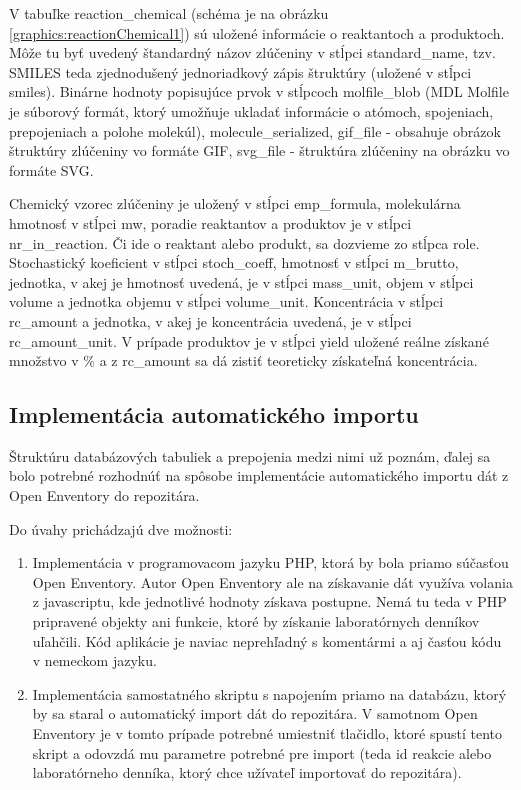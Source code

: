 \documentclass[thesis=M,slovak]{FITthesis}[2013/05/06]
\begin{document}

V tabuľke reaction\_chemical (schéma je na obrázku \ref{graphics:reactionChemical1}) sú uložené informácie o reaktantoch a produktoch. Môže tu byť uvedený štandardný názov zlúčeniny v stĺpci standard\_name, tzv. SMILES teda zjednodušený jednoriadkový zápis štruktúry (uložené v stĺpci smiles). Binárne hodnoty popisujúce prvok v stĺpcoch molfile\_blob (MDL Molfile je súborový formát, ktorý umožňuje ukladať informácie o atómoch, spojeniach, prepojeniach a polohe molekúl), molecule\_serialized, gif\_file - obsahuje obrázok štruktúry zlúčeniny vo formáte GIF, svg\_file - štruktúra zlúčeniny na obrázku vo formáte SVG.

Chemický vzorec zlúčeniny je uložený v stĺpci emp\_formula, molekulárna hmotnosť v stĺpci mw, poradie reaktantov a produktov je v stĺpci nr\_in\_reaction. Či ide o reaktant alebo produkt, sa dozvieme zo stĺpca role. Stochastický koeficient v stĺpci stoch\_coeff, hmotnosť v stĺpci m\_brutto, jednotka, v akej je hmotnosť uvedená, je v stĺpci mass\_unit, objem v stĺpci volume a jednotka objemu v stĺpci volume\_unit. Koncentrácia v stĺpci rc\_amount a jednotka, v akej je koncentrácia uvedená, je v stĺpci rc\_amount\_unit.
V prípade produktov je v stĺpci yield uložené reálne získané množstvo v \% a z rc\_amount sa dá zistiť teoreticky získateľná koncentrácia.

\subsection{Implementácia automatického importu}
Štruktúru databázových tabuliek a prepojenia medzi nimi už poznám, ďalej sa bolo potrebné rozhodnúť na spôsobe implementácie automatického importu dát z Open Enventory do repozitára.

Do úvahy prichádzajú dve možnosti:
\begin{enumerate}
	\item Implementácia v programovacom jazyku PHP, ktorá by bola priamo súčasťou Open Enventory. Autor Open Enventory ale na získavanie dát využíva volania z javascriptu, kde jednotlivé hodnoty získava postupne. Nemá tu teda v PHP pripravené objekty ani funkcie, ktoré by získanie laboratórnych denníkov uľahčili. Kód aplikácie je naviac neprehľadný s komentármi a aj časťou kódu v nemeckom jazyku.
	\item Implementácia samostatného skriptu s napojením priamo na databázu, ktorý by sa staral o automatický import dát do repozitára. V samotnom Open Enventory je v tomto prípade potrebné umiestniť tlačidlo, ktoré spustí tento skript a odovzdá mu parametre potrebné pre import (teda id reakcie alebo laboratórneho denníka, ktorý chce užívateľ importovať do repozitára).
\end{enumerate}
\end{document}
